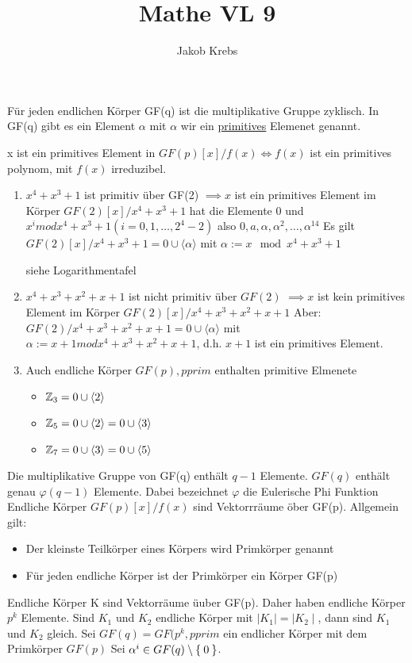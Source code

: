 \documentclass{../tudscript}
\author{Jakob Krebs}
\title{Mathe VL 9}
\begin{document}
Für jeden endlichen Körper GF(q) ist die multiplikative Gruppe zyklisch.
In GF(q) gibt es ein Element $\alpha$ mit
$\alpha$ wir ein \underline{primitives} Elemenet genannt.

x ist ein primitives Element in $GF(p)[x] / f(x) \iff f(x)$ ist ein primitives polynom, mit $f(x)$ irreduzibel.
\begin{enumerate}
  \item $x^4 + x^3 + 1$ ist primitiv über GF(2) $\implies x$ ist ein primitives Element im Körper %
    $GF(2)[x]/x^4+x^3 + 1$ hat die Elemente $0$ und $x^i mod x^4 + x^3 + 1 (i = 0, 1, \ldots, 2^4 -2)$ also $0, a, \alpha, \alpha^2, \ldots, \alpha^{14}$
    Es gilt $GF(2)[x]/x^4 + x^3 + 1 = 0 \cup \langle \alpha \rangle$ mit $\alpha:= x \mod x^4 + x^3 + 1$

    siehe Logarithmentafel
  \item $x^4 + x^3 + x^2 + x +1$ ist nicht primitiv über $GF(2)$ $\implies x$ ist kein primitives Element im Körper $GF(2)[x] / x^4 + x^3 + x^2 + x + 1$
    Aber: $GF(2)/x^4 + x^3 + x^2 + x + 1= 0 \cup \langle \alpha \rangle$ mit $\alpha := x+1 mod x^4 + x^3 + x^2 + x + 1$, d.h. $x + 1$ ist ein primitives Element.
  \item Auch endliche Körper $GF(p), p prim$ enthalten primitive Elmenete
    \begin{itemize}
    \item $\mathbb{Z}_3 = 0 \cup \langle 2 \rangle$
    \item $\mathbb{Z}_5 = 0 \cup \langle 2 \rangle = 0 \cup \langle 3 \rangle$
    \item $\mathbb{Z}_7 = 0 \cup \langle 3 \rangle = 0 \cup \langle 5 \rangle$
    \end{itemize}
\end{enumerate}
Die multiplikative Gruppe von GF(q) enthält $q-1$ Elemente. $GF(q)$ enthält genau $\varphi(q-1)$ Elemente. Dabei bezeichnet $\varphi$ die Eulerische Phi Funktion
Endliche Körper $GF(p)[x]/f(x)$ sind Vektorrräume öber GF(p).
Allgemein gilt:
\begin{itemize}
\item Der kleinste Teilkörper eines Körpers wird Primkörper genannt
  \item Für jeden endliche Körper ist der Primkörper ein Körper GF(p)
\end{itemize}
Endliche Körper K sind Vektorräume üuber GF(p). Daher haben endliche Körper $p^k$ Elemente.
Sind $K_1$ und $K_2$ endliche Körper mit $\mid K_1 \mid = \mid K_2 \mid$, dann sind $K_1$ und $K_2$ gleich.
Sei $GF(q) = GF(p^k, p prim$ ein endlicher Körper mit dem Primkörper $GF(p)$
Sei $\alpha^i \in GF(q) \setminus \Set{0}$.
\end{document}
